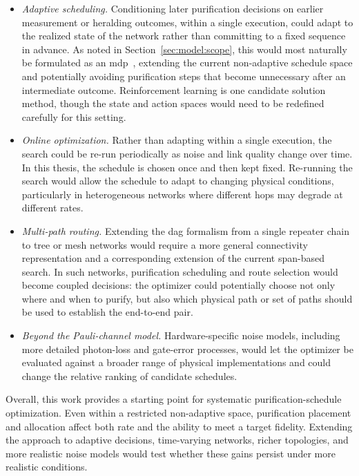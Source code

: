 \begin{itemize}

      \item \emph{Adaptive scheduling.} Conditioning later purification decisions on earlier measurement or heralding outcomes, within a single execution, could adapt to the realized state of the network rather than committing to a fixed sequence in advance. As noted in Section~\ref{sec:model:scope}, this would most naturally be formulated as an \Gls{mdp}~\cite{Puterman2009Markov,Sutton2014Reinforcement}, extending the current non-adaptive schedule space and potentially avoiding purification steps that become unnecessary after an intermediate outcome. Reinforcement learning is one candidate solution method, though the state and action spaces would need to be redefined carefully for this setting.

      \item \emph{Online optimization.} Rather than adapting within a single execution, the search could be re-run periodically as noise and link quality change over time. In this thesis, the schedule is chosen once and then kept fixed. Re-running the search would allow the schedule to adapt to changing physical conditions, particularly in heterogeneous networks where different hops may degrade at different rates.

      \item \emph{Multi-path routing.} Extending the \Gls{dag} formalism from a single repeater chain to tree or mesh networks would require a more general connectivity representation and a corresponding extension of the current span-based search. In such networks, purification scheduling and route selection would become coupled decisions: the optimizer could potentially choose not only where and when to purify, but also which physical path or set of paths should be used to establish the end-to-end pair.

      \item \emph{Beyond the Pauli-channel model.} Hardware-specific noise models, including more detailed photon-loss and gate-error processes, would let the optimizer be evaluated against a broader range of physical implementations and could change the relative ranking of candidate schedules.

\end{itemize}

\vspace{0.8cm}

Overall, this work provides a starting point for systematic purification-schedule optimization. Even within a restricted non-adaptive space, purification placement and allocation affect both rate and the ability to meet a target fidelity. Extending the approach to adaptive decisions, time-varying networks, richer topologies, and more realistic noise models would test whether these gains persist under more realistic conditions.

